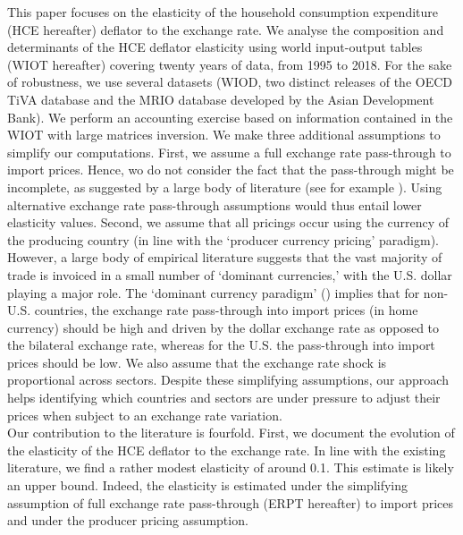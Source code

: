 \documentclass[11pt,a4paper]{article}
\begin{document}
This paper focuses on the elasticity of the household consumption expenditure (HCE hereafter) deflator to the exchange rate. 
We analyse the composition and determinants of the HCE deflator elasticity using world input-output tables (WIOT hereafter) covering twenty years of data, from 1995 to 2018.
For the sake of robustness, we use several datasets (WIOD, two distinct releases of the OECD TiVA database and the MRIO database developed by the Asian Development Bank). 
We perform an accounting exercise based on information contained in the WIOT with large matrices inversion. 
We make three additional assumptions to simplify our computations. 
First, we assume a full exchange rate pass-through to import prices. 
Hence, wo do not consider the fact that the pass-through might be incomplete, as suggested by a large body of literature (see for example \cite{Berman2012}).
Using alternative exchange rate pass-through assumptions would thus entail lower elasticity values. 
Second, we assume that all pricings occur using the currency of the producing country (in line with the ‘producer currency pricing’ paradigm). 
However, a large body of empirical literature suggests that the vast majority of trade is invoiced in a small number of ‘dominant currencies,’ with the U.S. dollar playing a major role. The ‘dominant currency paradigm’ (\cite{Gopinath2020}) implies that for non-U.S. countries, the exchange rate pass-through into import prices (in home currency) should be high and driven by the dollar exchange rate as opposed to the bilateral exchange rate, whereas for the U.S. the pass-through into import prices should be low.
We also assume that the exchange rate shock is proportional across sectors. 
Despite these simplifying assumptions, our approach helps identifying which countries and sectors are under pressure to adjust their prices when subject to an exchange rate variation.\\
Our contribution to the literature is fourfold. 
First, we document the evolution of the elasticity of the HCE deflator to the exchange rate.
In line with the existing literature, we find a rather modest elasticity of around 0.1. 
This estimate is likely an upper bound. 
Indeed, the elasticity is estimated under the simplifying assumption of full exchange rate pass-through (ERPT hereafter) to import prices and under the producer pricing assumption.
\end{document}
